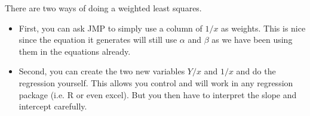 \documentclass{article}
\begin{document}
There are two ways of doing a weighted least squares. 
\begin{itemize}
\item  First, you can
ask JMP to simply use a column of $1/x$ as weights.  This is nice
since the equation it generates will still use $\alpha$ and $\beta$ as
we have been using them in the equations already.  
\item Second, you can create the two new variables $Y/x$ and $1/x$ and
do the regression yourself.  This allows you control and will work in
any regression package (i.e. R or even excel).  But you then have to
interpret the slope and intercept carefully.
\end{itemize}
\end{document}
